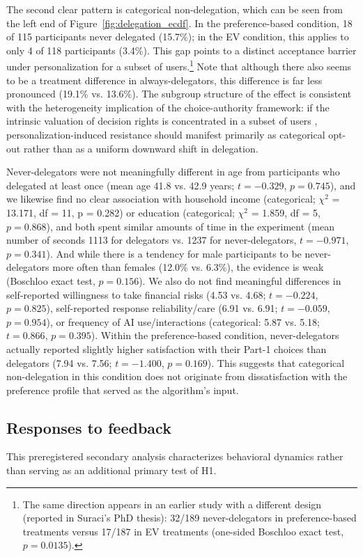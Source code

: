 \documentclass[a4paper, 12pt, fleqn]{article}
\theoremstyle{definition}
\begin{document}
The second clear pattern is categorical non-delegation, which can be seen from the left end of Figure~\ref{fig:delegation_ecdf}. In the preference-based condition, 18 of 115 participants never delegated (15.7\%); in the EV condition, this applies to only 4 of 118 participants (3.4\%). This gap points to a distinct acceptance barrier under personalization for a subset of users.\footnote{The same direction appears in an earlier study with a different design (reported in Suraci's PhD thesis): 32/189 never-delegators in preference-based treatments versus 17/187 in EV treatments (one-sided Boschloo exact test, $p = 0.0135$).} Note that although there also seems to be a treatment difference in always-delegators, this difference is far less pronounced (19.1\% vs. 13.6\%). The subgroup structure of the effect is consistent with the heterogeneity implication of the choice-authority framework: if the intrinsic valuation of decision rights is concentrated in a subset of users \citep{Bartling2014,Owens2014}, personalization-induced resistance should manifest primarily as categorical opt-out rather than as a uniform downward shift in delegation.

Never-delegators were not meaningfully different in age from participants who delegated at least once (mean age 41.8 vs. 42.9 years; $t = -0.329$, $p = 0.745$), and we likewise find no clear association with household income (categorical; \(\chi^2\) = 13.171, df = 11, p = 0.282) or education (categorical; \(\chi^2\) = 1.859, df = 5, $p = 0.868$), and both spent similar amounts of time in the experiment (mean number of seconds 1113 for delegators vs. 1237 for never-delegators, $t = -0.971$, $p = 0.341$). And while there is a tendency for male participants to be never-delegators more often than females (12.0\% vs. 6.3\%), the evidence is weak (Boschloo exact test, $p = 0.156$). We also do not find meaningful differences in self-reported willingness to take financial risks (4.53 vs. 4.68; $t = -0.224$, $p = 0.825$), self-reported response reliability/care (6.91 vs. 6.91; $t = -0.059$, $p = 0.954$), or frequency of AI use/interactions (categorical: 5.87 vs. 5.18; $t = 0.866$, $p = 0.395$).
Within the preference-based condition, never-delegators actually reported slightly higher satisfaction with their Part-1 choices than delegators (7.94 vs. 7.56; $t = -1.400$, $p = 0.169$). This suggests that categorical non-delegation in this condition does not originate from dissatisfaction with the preference profile that served as the algorithm's input.


\subsection{Responses to feedback}
This preregistered secondary analysis characterizes behavioral dynamics rather than serving as an additional primary test of H1.
\end{document}
